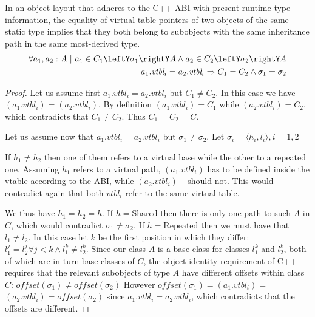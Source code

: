 \begin{theorem}
In an object layout that adheres to the C++ ABI with present runtime type 
information, the equality of virtual table pointers of two objects of the same 
static type implies that they both belong to subobjects with the same 
inheritance path in the same most-derived type.
\begin{eqnarray*}
    \forall a_1, a_2 : A\ |\ a_1\in C_1\leftY\sigma_1\rightY A \wedge a_2\in C_2\leftY\sigma_2\rightY A \\
    a_1.\textit{vtbl}_i = a_2.\textit{vtbl}_i \Rightarrow C_1 = C_2 \wedge \sigma_1 = \sigma_2
\end{eqnarray*}
\label{thm:vtbl}
\end{theorem}
\begin{proof}
Let us assume first $a_1.\textit{vtbl}_i = a_2.\textit{vtbl}_i$ but $C_1 \neq C_2$. In this case we 
have $(a_1.\textit{vtbl}_i) = $$(a_2.\textit{vtbl}_i)$. By definition 
$(a_1.\textit{vtbl}_i) = C_1$ while $(a_2.\textit{vtbl}_i) = C_2$, which 
contradicts that $C_1 \neq C_2$. Thus $C_1 = C_2 = C$.

Let us assume now that $a_1.\textit{vtbl}_i = a_2.\textit{vtbl}_i$ but $\sigma_1 \neq \sigma_2$. 
Let $\sigma_i=\langle h_i,l_i\rangle,i=1,2$ 

If $h_1 \neq h_2$ then one of them refers to a virtual base while the other to a 
repeated one. Assuming $h_1$ refers to a virtual path, $(a_1.\textit{vtbl}_i)$ 
has to be defined inside the vtable according to the ABI, while 
$(a_2.\textit{vtbl}_i)$ -- should not. This would contradict again that both 
$vtbl_i$ refer to the same virtual table.

We thus have $h_1 = h_2 = h$. If $h = \mathrm{Shared}$ then there is only one path to 
such $A$ in $C$, which would contradict $\sigma_1 \neq \sigma_2$. 
If $h = \mathrm{Repeated}$ then we must have that $l_1 \neq l_2$. In this case let $k$ be 
the first position in which they differ: 
$l_1^j=l_2^j \forall j<k \wedge l_1^k\neq l_2^k$. Since our class $A$ is a base 
class for classes $l_1^k$ and $l_2^k$, both of which are in turn base classes of 
$C$, the object identity requirement of C++ requires that the relevant subobjects 
of type $A$ have different offsets within class $C$: 
$\mathit{offset}(\sigma_1)\neq \mathit{offset}(\sigma_2)$ However 
$\mathit{offset}(\sigma_1)=$$(a_1.\textit{vtbl}_i)=$$(a_2.\textit{vtbl}_i)=\mathit{offset}(\sigma_2)$ 
since $a_1.\textit{vtbl}_i = a_2.\textit{vtbl}_i$, which contradicts that the offsets are different.
\end{proof}

